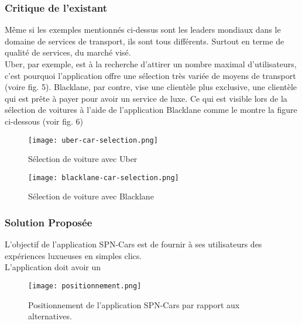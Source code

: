 \subsubsection{Critique de l'existant}
Même si les exemples mentionnés ci-dessus sont les leaders mondiaux dans le domaine de services de transport, ils sont tous différents. Surtout en terme de qualité de services, du marché visé.\\
\noindent Uber, par exemple, est à la recherche d'attirer un nombre maximal d'utilisateurs, c'est pourquoi l'application offre une sélection très variée de moyens de transport (voire fig. 5). Blacklane, par contre, vise une clientèle plus exclusive, une clientèle qui est prête à payer pour avoir un service de luxe. Ce qui est visible lors de la sélection de voitures à l'aide de l'application Blacklane comme le montre la figure ci-dessous (voir fig. 6)
\vspace{1cm}
\begin{multicols}{2}
    \begin{figure}[H]
        \centering
        \texttt{[image: uber-car-selection.png]}
        \vspace{1cm}
        \caption{Sélection de voiture avec Uber}
        \label{fig:uber_selection}
    \end{figure}
    \begin{figure}[H]
        \centering
        \texttt{[image: blacklane-car-selection.png]}
        \vspace{1cm}
        \caption{Sélection de voiture avec Blacklane}
        \label{fig:blacklane_selection}
    \end{figure}
\end{multicols}
\subsubsection{Solution Proposée}
L'objectif de l'application SPN-Cars est de fournir à ses utilisateurs des expériences luxueuses en simples clics.\\
L'application doit avoir un
\begin{figure}[H]
    \centering
    \texttt{[image: positionnement.png]}
    \vspace{1cm}
    \caption{Positionnement de l'application SPN-Cars par rapport aux alternatives.}
    \label{fig:positionnement_marcha}
\end{figure}
